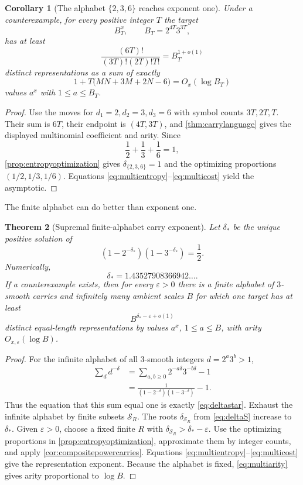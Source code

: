 \documentclass[11pt,oneside]{article}
\newtheorem{theorem}{Theorem}[section]
\newtheorem{corollary}[theorem]{Corollary}
\theoremstyle{definition}
\begin{document}
\begin{corollary}[The alphabet \texorpdfstring{$\{2,3,6\}$}{\{2,3,6\}} reaches exponent one]\label{cor:236}
Under a counterexample, for every positive integer $T$ the target
\[
       B_T^x,
       \qquad B_T=2^{4T}3^{3T},
\]
has at least
\[
       \frac{(6T)!}{(3T)!(2T)!T!}=B_T^{1+o(1)}
\]
distinct representations as a sum of exactly
\[
       1+T\bigl(MN+3M+2N-6\bigr)
       =O_x(\log B_T)
\]
values $a^x$ with $1\le a\le B_T$.
\end{corollary}

\begin{proof}
Use the moves for $d_1=2,d_2=3,d_3=6$ with symbol counts
$3T,2T,T$.  Their sum is $6T$, their endpoint is
$(4T,3T)$, and \cref{thm:carrylanguage} gives the displayed multinomial coefficient and arity.  Since
\[
       \frac12+\frac13+\frac16=1,
\]
\cref{prop:entropyoptimization} gives $\delta_{\{2,3,6\}}=1$ and the optimizing proportions $(1/2,1/3,1/6)$.  Equations
\eqref{eq:multientropy}--\eqref{eq:multicost} yield the asymptotic.
\end{proof}

The finite alphabet can do better than exponent one.

\begin{theorem}[Supremal finite-alphabet carry exponent]\label{thm:smoothcarryexponent}
Let $\delta_*$ be the unique positive solution of
\begin{equation}\label{eq:deltastar}
  (1-2^{-\delta_*})(1-3^{-\delta_*})=\frac12.
\end{equation}
Numerically,
\[
       \delta_*=1.43527908366942\ldots.
\]
If a counterexample exists, then for every $\varepsilon>0$ there is a finite alphabet of $3$-smooth carries and infinitely many ambient scales $B$ for which one target has at least
\[
       B^{\delta_*-\varepsilon+o(1)}
\]
distinct equal-length representations by values $a^x$, $1\le a\le B$, with arity $O_{x,\varepsilon}(\log B)$.
\end{theorem}

\begin{proof}
For the infinite alphabet of all $3$-smooth integers $d=2^a3^b>1$,
\begin{align*}
 \sum_{d}d^{-\delta}
 &=\sum_{a,b\ge0}2^{-a\delta}3^{-b\delta}-1\\
 &=\frac{1}{(1-2^{-\delta})(1-3^{-\delta})}-1.
\end{align*}
Thus the equation that this sum equal one is exactly \eqref{eq:deltastar}.  Exhaust the infinite alphabet by finite subsets $\mathcal S_R$.  The roots $\delta_{\mathcal S_R}$ from \eqref{eq:deltaS} increase to $\delta_*$.  Given $\varepsilon>0$, choose a fixed finite $R$ with
$\delta_{\mathcal S_R}>\delta_*-\varepsilon$.  Use the optimizing proportions in \cref{prop:entropyoptimization}, approximate them by integer counts, and apply \cref{cor:compositepowercarries}.  Equations
\eqref{eq:multientropy}--\eqref{eq:multicost} give the representation exponent.  Because the alphabet is fixed, \eqref{eq:multiarity} gives arity proportional to $\log B$.
\end{proof}
\end{document}
